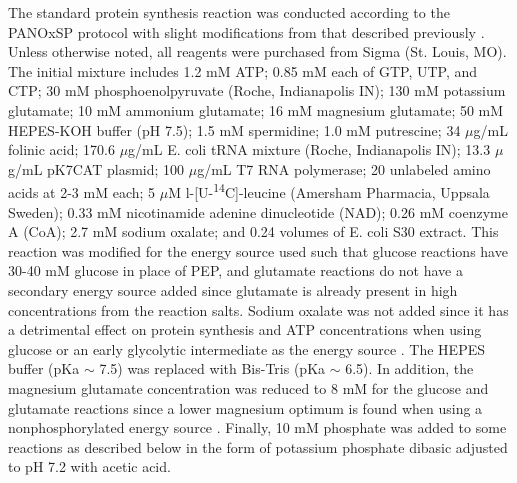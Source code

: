 \documentclass[journal=asbcd6,manuscript=article]{achemso}
\begin{document}
The standard protein synthesis reaction was conducted according to the PANOxSP protocol with slight modifications from that described previously \cite{BIT:BIT20026}.
Unless otherwise noted, all reagents were purchased from Sigma (St. Louis, MO).
The initial mixture includes 1.2 mM ATP; 0.85 mM each of GTP, UTP, and CTP; 30 mM phosphoenolpyruvate (Roche, Indianapolis IN); 130 mM potassium glutamate; 10 mM ammonium glutamate; 16 mM magnesium glutamate; 50 mM HEPES-KOH buffer (pH 7.5); 1.5 mM spermidine; 1.0 mM putrescine; 34 $\mu$g/mL folinic acid; 170.6 $\mu$g/mL E. coli tRNA mixture (Roche, Indianapolis IN); 13.3 $\mu$g/mL pK7CAT plasmid; 100 $\mu$g/mL T7 RNA polymerase; 20 unlabeled amino acids at 2-3 mM each; 5 $\mu$M l-[U-\textsuperscript{14}C]-leucine (Amersham Pharmacia, Uppsala Sweden); 0.33 mM nicotinamide adenine dinucleotide (NAD); 0.26 mM coenzyme A (CoA); 2.7 mM sodium oxalate; and 0.24 volumes of E. coli S30 extract.
This reaction was modified for the energy source used such that glucose reactions have 30-40 mM glucose in place of PEP, and glutamate reactions do not have a secondary energy source added since glutamate is already present in high concentrations from the reaction salts. Sodium oxalate was not added since it has a detrimental effect on protein synthesis and ATP concentrations when using glucose or an early glycolytic intermediate as the energy source \cite{BIT:BIT1121}. The HEPES buffer (pKa $\sim$ 7.5) was replaced with Bis-Tris (pKa $\sim$ 6.5). In addition, the magnesium glutamate concentration was reduced to 8 mM for the glucose and glutamate reactions since a lower magnesium optimum is found when using a nonphosphorylated energy source \cite{BIT:BIT20026}. Finally, 10 mM phosphate was added to some reactions as described below in the form of potassium phosphate dibasic adjusted to pH 7.2 with acetic acid.
\end{document}

